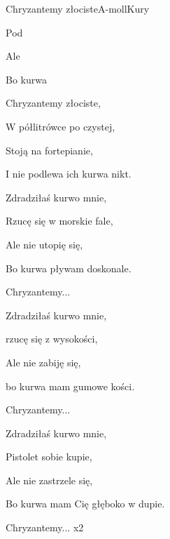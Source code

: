 \begin{song}{Chryzantemy złociste}{A-moll}{}{Kury}{}{}
  \begin{SBVerse}
     

    Pod  

    Ale  

    Bo kurwa  
  \end{SBVerse}
  \begin{SBChorus}
    Chryzantemy złociste,

    W półlitrówce po czystej,

    Stoją na fortepianie,

    I nie podlewa ich kurwa nikt.
  \end{SBChorus}
  \begin{SBVerse}
    Zdradziłaś kurwo mnie,

    Rzucę się w morskie fale,

    Ale nie utopię się,

    Bo kurwa pływam doskonale.
  \end{SBVerse}
  \begin{SBChorus}
    Chryzantemy...
  \end{SBChorus}
  \begin{SBVerse}
    Zdradziłaś kurwo mnie,

    rzucę się z wysokości,

    Ale nie zabiję się,

    bo kurwa mam gumowe kości.
  \end{SBVerse}
  \begin{SBChorus}
    Chryzantemy...
  \end{SBChorus}
  \begin{SBVerse}
    Zdradziłaś kurwo mnie,

    Pistolet sobie kupie,

    Ale nie zastrzele się,

    Bo kurwa mam Cię głęboko w dupie.
  \end{SBVerse}
  \begin{SBChorus}
    Chryzantemy... x2
  \end{SBChorus}
\end{song}
